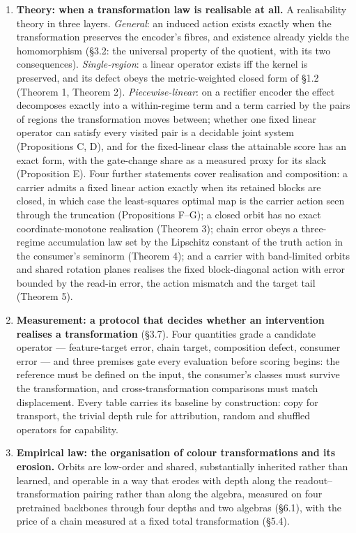 \setcounter{enumi}{0}
\begin{enumerate}
\item \textbf{Theory: when a transformation law is realisable at all.} A realisability theory in three layers. \textit{General}: an induced action exists exactly when the transformation preserves the encoder's fibres, and existence already yields the homomorphism (\S{}3.2: the universal property of the quotient, with its two consequences). \textit{Single-region}: a linear operator exists iff the kernel is preserved, and its defect obeys the metric-weighted closed form of \S{}1.2 (Theorem 1, Theorem 2). \textit{Piecewise-linear}: on a rectifier encoder the effect decomposes exactly into a within-regime term and a term carried by the pairs of regions the transformation moves between; whether one fixed linear operator can satisfy every visited pair is a decidable joint system (Propositions C, D), and for the fixed-linear class the attainable score has an exact form, with the gate-change share as a measured proxy for its slack (Proposition E). Four further statements cover realisation and composition: a carrier admits a fixed linear action exactly when its retained blocks are closed, in which case the least-squares optimal map is the carrier action seen through the truncation (Propositions F--G); a closed orbit has no exact coordinate-monotone realisation (Theorem 3); chain error obeys a three-regime accumulation law set by the Lipschitz constant of the truth action in the consumer's seminorm (Theorem 4); and a carrier with band-limited orbits and shared rotation planes realises the fixed block-diagonal action with error bounded by the read-in error, the action mismatch and the target tail (Theorem 5).

\item \textbf{Measurement: a protocol that decides whether an intervention realises a transformation} (\S{}3.7). Four quantities grade a candidate operator --- feature-target error, chain target, composition defect, consumer error --- and three premises gate every evaluation before scoring begins: the reference must be defined on the input, the consumer's classes must survive the transformation, and cross-transformation comparisons must match displacement. Every table carries its baseline by construction: copy for transport, the trivial depth rule for attribution, random and shuffled operators for capability.

\item \textbf{Empirical law: the organisation of colour transformations and its erosion.} Orbits are low-order and shared, substantially inherited rather than learned, and operable in a way that erodes with depth along the readout--transformation pairing rather than along the algebra, measured on four pretrained backbones through four depths and two algebras (\S{}6.1), with the price of a chain measured at a fixed total transformation (\S{}5.4).


\end{enumerate}
